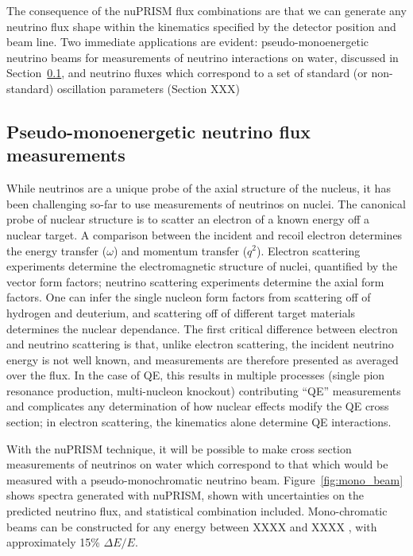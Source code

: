 The consequence of the nuPRISM flux combinations are that we can generate any neutrino flux shape within the kinematics specified by the detector position and beam line. Two immediate applications are evident: pseudo-monoenergetic neutrino beams for measurements of neutrino interactions on water, discussed in Section~\ref{sec:mono}, and neutrino fluxes which correspond to a set of standard (or non-standard) oscillation parameters (Section XXX)

\subsection{Pseudo-monoenergetic neutrino flux measurements}
\label{sec:mono}


While neutrinos are a unique probe of the axial structure of the nucleus, it has been challenging so-far to use measurements of neutrinos on nuclei. The canonical probe of nuclear structure is to scatter an electron of a known energy off a nuclear target. A comparison between the incident and recoil electron determines the energy transfer ($\omega$) and momentum transfer ($q^2$). Electron scattering experiments determine the electromagnetic structure of nuclei, quantified by the vector form factors; neutrino scattering experiments determine the axial form factors. One can infer the single nucleon form factors from scattering off of hydrogen and deuterium, and scattering off of different target materials determines the nuclear dependance.  The first critical difference between electron and neutrino scattering is that, unlike electron scattering, the incident neutrino energy is not well known, and measurements are therefore presented as averaged over the flux. In the case of QE, this results in multiple processes (single pion resonance production, multi-nucleon knockout) contributing ``QE'' measurements and complicates any  determination of how nuclear effects modify the QE cross section; in electron scattering, the kinematics alone determine QE interactions.  

With the nuPRISM technique, it will be possible to make cross section measurements of neutrinos on water which correspond to that which would be measured with a pseudo-monochromatic neutrino beam. Figure~\ref{fig:mono_beam} shows spectra generated with nuPRISM, shown with uncertainties on the predicted neutrino flux, and statistical combination included. Mono-chromatic beams can be constructed for any energy between {\color{red} XXXX and XXXX }, with approximately 15\% $\Delta E / E$.

